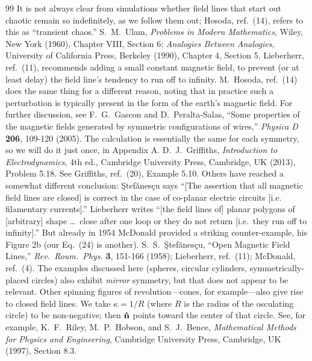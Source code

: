 \documentclass[aps,prb,twocolumn,groupedaddress,noshowpacs,checklength,amsmath]{revtex4-1}
\def\nhat{{\bf \hat n}}
\begin{document}
\begin{thebibliography}{99}
 It is not always clear from simulations whether field lines that start out chaotic remain so indefinitely, as we follow them out; Hosoda, ref.~(14), refers to this as ``transient chaos.''
 S.~M.~Ulam, {\it Problems in Modern Mathematics}, Wiley, New York (1960), Chapter VIII, Section 6; {\it Analogies Between Analogies}, University of California Press, Berkeley (1990), Chapter 4, Section 5.
 Lieberherr, ref.~(11), recommends adding a small constant magnetic field, to prevent (or at least delay) the field line's tendency to run off to infinity.  M.~Hosoda, ref.~(14) does the same thing for a different reason, noting that in practice such a perturbation is typically present in the form of the earth's magnetic field.
 For further discussion, see F.~G.~Gascon and D.~Peralta-Salas, ``Some properties of the magnetic fields generated by symmetric configurations of wires,'' {\it Physica D} {\bf 206}, 109-120 (2005).
 The calculation is essentially the same for each symmetry, so we will do it just once, in Appendix A.
 D.~J.~Griffiths, {\it Introduction to Electrodynamics}, 4th ed., Cambridge University Press, Cambridge, UK (2013), Problem 5.18.
 See Griffiths, ref.~(20), Example 5.10.
 Others have reached a somewhat different conclusion: \c{S}tef\u{a}nes\c{c}u says  ``[The assertion that all magnetic field lines are closed] is correct in the case of co-planar electric circuits [i.e. filamentary currents].''  Lieberherr writes ``[the field lines of] planar polygons of [arbitrary] shape \ldots\ close after one loop or they do not return [i.e.~they run off to infinity].''  But already in 1954 McDonald provided a striking counter-example, his Figure 2b (our Eq.~(24) is another).  S.~S.~\c{S}tef\u{a}nes\c{c}u, ``Open Magnetic Field Lines,'' {\it Rev.~Roum.~Phys.} {\bf 3}, 151-166 (1958); Lieberherr, ref.~(11); McDonald, ref.~(4).
 The examples discussed here (spheres, circular cylinders, symmetrically-placed circles) also exhibit {\it mirror} symmetry, but that does not appear to be relevant.  Other spinning figures of revolution---cones, for example---also give rise to closed field lines.
 We take $\kappa = 1/R$ (where $R$ is the radius of the osculating circle) to be non-negative; then $\nhat$ points toward the center of that circle.
 See, for example, K.~F.~Riley, M.~P.~Hobson, and S.~J.~Bence, {\it Mathematical Methods for Physics and Engineering}, Cambridge University Press, Cambridge, UK (1997), Section 8.3.

\end{thebibliography}
 
\end{document}
